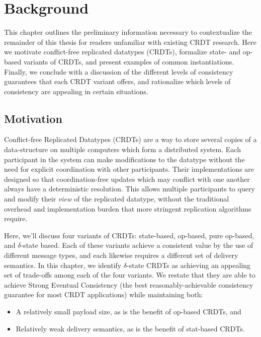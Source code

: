 \chapter{Background}
\label{chap:background}

This chapter outlines the preliminary information necessary to contextualize the
remainder of this thesis for readers unfamiliar with existing CRDT research.
Here we motivate conflict-free replicated datatypes (CRDTs), formalize state-
and op-based variants of CRDTs, and present examples of common instantiations.
Finally, we conclude with a discussion of the different levels of consistency
guarantees that each CRDT variant offers, and rationalize which levels of
consistency are appealing in certain situations.

\section{Motivation}
Conflict-free Replicated Datatypes (CRDTs) are a way to store several copies of
a data-structure on multiple computers which form a distributed system. Each
participant in the system can make modifications to the datatype without
the need for explicit coordination with other participants. Their
implementations are designed so that coordination-free updates which may
conflict with one another always have a deterministic resolution. This allows
multiple participants to query and modify their \emph{view} of the replicated
datatype, without the traditional overhead and implementation burden that more
stringent replication algorithms require.

Here, we'll discuss four variants of CRDTs: state-based, op-based, pure
op-based, and $\delta$-state based. Each of these variants achieve a consistent
value by the use of different message types, and each likewise requires a
different set of delivery semantics. In this chapter, we identify $\delta$-state
CRDTs as achieving an appealing set of trade-offs among each of the four
variants. We restate that they are able to achieve Strong Eventual Consistency
(the best reasonably-achievable consistency guarantee for most CRDT
applications) while maintaining both:
\begin{itemize}
  \item A relatively small payload size, as is the benefit of op-based CRDTs,
    and
  \item Relatively weak delivery semantics, as is the benefit of stat-based
    CRDTs.
\end{itemize}

